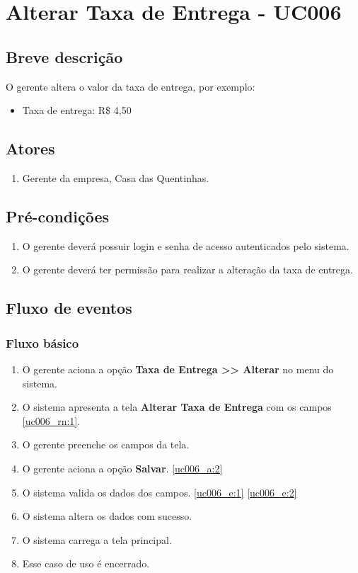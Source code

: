 \chapter{Alterar Taxa de Entrega - UC006} \label{uc006}

\section{Breve descrição}

O gerente altera o valor da taxa de entrega, por exemplo:

\begin{itemize}
	\item Taxa de entrega: R\$ 4,50
\end{itemize}

\section{Atores}

\begin{enumerate}
	\item Gerente da empresa, Casa das Quentinhas.
\end{enumerate}

\section{Pré-condições}

\begin{enumerate}
	\item O gerente deverá possuir login e senha de acesso autenticados pelo sistema.
	\item O gerente deverá ter permissão para realizar a alteração da taxa de entrega.
\end{enumerate}

\section{Fluxo de eventos}

\subsection{Fluxo básico}

\begin{enumerate}[label=P\arabic*]
	\item O gerente aciona a opção \textbf{Taxa de Entrega >> Alterar} no menu do sistema.
	\item O sistema apresenta a tela \textbf{Alterar Taxa de Entrega} com os campos \ref{uc006_rn:1}. \label{uc006_p:2}
	\item O gerente preenche os campos da tela. \label{uc006_p:3}
	\item O gerente aciona a opção \textbf{Salvar}. \label{uc006_p:4}\ref{uc006_a:2}
	\item O sistema valida os dados dos campos. \ref{uc006_e:1} \ref{uc006_e:2}
	\item O sistema altera os dados com sucesso.
	\item O sistema carrega a tela principal.
	\item Esse caso de uso é encerrado.	
\end{enumerate}

